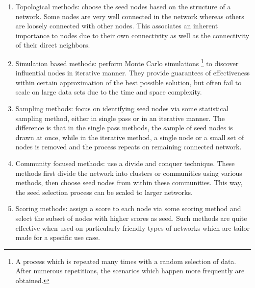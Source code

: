 	\begin{enumerate}
		\item Topological methods: choose the seed nodes based on the structure of a network. Some nodes are very well connected in the network whereas others are loosely connected with other nodes. This associates an inherent importance to nodes due to their own connectivity as well as the connectivity of their direct neighbors.  %
		
		\item Simulation based methods: perform Monte Carlo simulations \footnote{A process which is repeated many times with a random selection of data. After numerous repetitions, the scenarios which happen more frequently are obtained.} to discover influential nodes in iterative manner. They provide guarantees of effectiveness within certain approximation of the best possible solution, but often fail to scale on large data sets due to the time and space complexity.
		
		\item Sampling methods: focus on identifying seed nodes via some statistical sampling method, either in single pass or in an iterative manner. The difference is that in the single pass methods, the sample of seed nodes is drawn at once, while in the iterative method, a single node or a small set of nodes is removed and the process repeats on remaining connected network.
			
		\item Community focused methods: use a divide and conquer technique. These methods first divide the network into clusters or communities using various methods, then choose seed nodes from within these communities. This way, the seed selection process can be scaled to larger networks.

		\item Scoring methods: assign a score to each node via some scoring method and select the subset of nodes with higher scores as seed. Such methods are quite effective when used on particularly friendly types of networks which are tailor made for a specific use case. %
		
	\end{enumerate}

	
